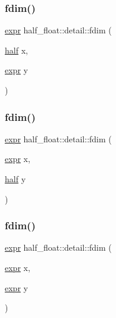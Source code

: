 \subsubsection{\texorpdfstring{fdim()}{fdim()}\hspace{0.1cm}{\footnotesize\ttfamily [2/4]}}
{\footnotesize\ttfamily \hyperlink{structhalf__float_1_1detail_1_1expr}{expr} half\+\_\+float\+::detail\+::fdim (\begin{DoxyParamCaption}\item[{\hyperlink{classhalf__float_1_1half}{half}}]{x,  }\item[{\hyperlink{structhalf__float_1_1detail_1_1expr}{expr}}]{y }\end{DoxyParamCaption})\hspace{0.3cm}{\ttfamily [inline]}}

\mbox{\label{namespacehalf__float_1_1detail_ae61860ac1f7a992e560e37d7340e662d}} 
\subsubsection{\texorpdfstring{fdim()}{fdim()}\hspace{0.1cm}{\footnotesize\ttfamily [3/4]}}
{\footnotesize\ttfamily \hyperlink{structhalf__float_1_1detail_1_1expr}{expr} half\+\_\+float\+::detail\+::fdim (\begin{DoxyParamCaption}\item[{\hyperlink{structhalf__float_1_1detail_1_1expr}{expr}}]{x,  }\item[{\hyperlink{classhalf__float_1_1half}{half}}]{y }\end{DoxyParamCaption})\hspace{0.3cm}{\ttfamily [inline]}}

\mbox{\label{namespacehalf__float_1_1detail_abcd504ab32799e08fc260c412b136f27}} 
\subsubsection{\texorpdfstring{fdim()}{fdim()}\hspace{0.1cm}{\footnotesize\ttfamily [4/4]}}
{\footnotesize\ttfamily \hyperlink{structhalf__float_1_1detail_1_1expr}{expr} half\+\_\+float\+::detail\+::fdim (\begin{DoxyParamCaption}\item[{\hyperlink{structhalf__float_1_1detail_1_1expr}{expr}}]{x,  }\item[{\hyperlink{structhalf__float_1_1detail_1_1expr}{expr}}]{y }\end{DoxyParamCaption})\hspace{0.3cm}{\ttfamily [inline]}}

